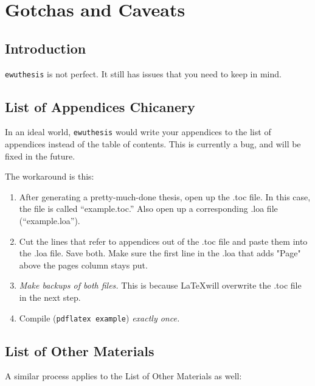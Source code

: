 \chapter{Gotchas and Caveats}

\section{Introduction}

\texttt{ewuthesis} is not perfect. It still has issues that you need to keep
in mind.

\section{List of Appendices Chicanery}

In an ideal world, \texttt{ewuthesis} would write your appendices to the
list of appendices instead of the table of contents. This is currently a bug,
and will be fixed in the future.

The workaround is this:

\begin{enumerate}
\item After generating a pretty-much-done thesis, open up the .toc file. In
this case, the file is called ``example.toc.'' Also open up a corresponding
.loa file (``example.loa'').
\item Cut the lines that refer to appendices out of the .toc file and paste
them into the .loa file. Save both. Make sure the first line in the .loa
that adds "Page" above the pages column stays put.
\item \emph{Make backups of both files.} This is because \LaTeX will overwrite
the .toc file in the next step.
\item Compile (\texttt{pdflatex example}) \emph{exactly once.}
\end{enumerate}

\section{List of Other Materials}

A similar process applies to the List of Other Materials as well:

